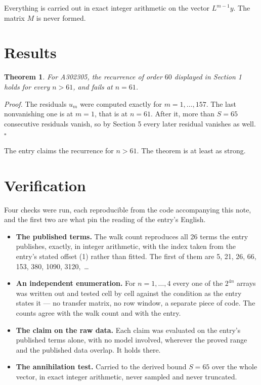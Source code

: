 \documentclass[11pt]{article}
\newtheorem{theorem}{Theorem}
\theoremstyle{definition}
\begin{document}
Everything is carried out in exact integer arithmetic on the vector $L^{m-1}y$. The matrix $M$ is never formed.

\section{Results}

\begin{theorem} For A302305, the recurrence of order $60$ displayed in Section 1 holds for every $n > 61$, and fails at $n = 61$.\end{theorem}

{\itshape Proof.} The residuals $u_m$ were computed exactly for $m = 1,\dots,157$. The last nonvanishing one is at $m = 1$, that is at $n = 61$. After it, more than $S = 65$ consecutive residuals vanish, so by Section 5 every later residual vanishes as well. $\square$

The entry claims the recurrence for $n > 61$. The theorem is at least as strong.

\section{Verification}

Four checks were run, each reproducible from the code accompanying this note, and the first two are what pin the reading of the entry's English.

\begin{itemize}

\item {\bfseries The published terms.} The walk count reproduces all 26 terms the entry publishes, exactly, in integer arithmetic, with the index taken from the entry's stated offset (1) rather than fitted. The first of them are 5, 21, 26, 66, 153, 380, 1090, 3120,~\dots

\item {\bfseries An independent enumeration.} For $n = 1,\dots,4$ every one of the $2^{4n}$ arrays was written out and tested cell by cell against the condition as the entry states it --- no transfer matrix, no row window, a separate piece of code. The counts agree with the walk count and with the entry.

\item {\bfseries The claim on the raw data.} Each claim was evaluated on the entry's published terms alone, with no model involved, wherever the proved range and the published data overlap. It holds there.

\item {\bfseries The annihilation test.} Carried to the derived bound $S = 65$ over the whole vector, in exact integer arithmetic, never sampled and never truncated.

\end{itemize}
\end{document}
